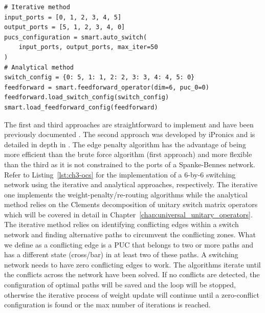 \begin{lstlisting}[caption={Implementation of iterative and analytical switch networks using the first-generation Smartlight API}, label=lst:ch3-ocs]
# Iterative method
input_ports = [0, 1, 2, 3, 4, 5]
output_ports = [5, 1, 2, 3, 4, 0]
pucs_configuration = smart.auto_switch(
    input_ports, output_ports, max_iter=50 
)
# Analytical method
switch_config = {0: 5, 1: 1, 2: 2, 3: 3, 4: 4, 5: 0}
feedforward = smart.feedforward_operator(dim=6, puc_0=0)
feedforward.load_switch_config(switch_config)
smart.load_feedforward_config(feedforward)
\end{lstlisting}

The first and third approaches are straightforward to implement and have been previously documented \cite{lopez_auto-routing_2020,jia_six-port_2018}.
The second approach was developed by iPronics and is detailed in depth in \cite{xie_software-defined_2024}.
The edge penalty algorithm has the advantage of being more efficient than the brute force algorithm (first approach) and more flexible than the third as it is not constrained to the ports of a Spanke-Bennes network.
Refer to Listing~\ref{lst:ch3-ocs} for the implementation of a 6-by-6 switching network using the iterative and analytical approaches, respectively.
The iterative one implements the weight-penalty/re-routing algorithms while the analytical method relies on the Clements decomposition of unitary switch matrix operators which will be covered in detail in Chapter~\ref{chap:universal_unitary_operators}.
The iterative method relies on identifying conflicting edges within a switch network and finding alternative paths to circumvent the conflicting zones.
What we define as a conflicting edge is a PUC that belongs to two or more paths and has a different state (cross/bar) in at least two of these paths.
A switching network needs to have zero conflicting edges to work.
The algorithms iterate until the conflicts across the network have been solved.
If no conflicts are detected, the configuration of optimal paths will be saved and the loop will be stopped, otherwise the iterative process of weight update will continue until a zero-conflict configuration is found or the max number of iterations is reached.
